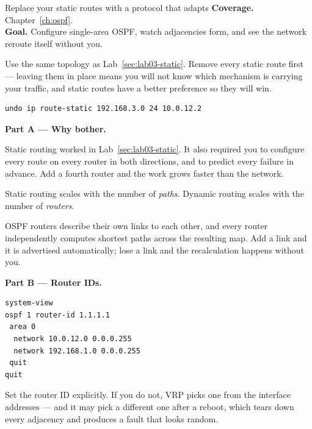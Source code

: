 
\begin{labproject}{Replace your static routes with a protocol that adapts}
\textbf{Coverage.} Chapter~\ref{ch:ospf}.\\
\textbf{Goal.} Configure single-area OSPF, watch adjacencies form, and see the network reroute itself without you.

\begin{labmode}
Use the same topology as Lab~\ref{sec:lab03-static}. Remove every static route first --- leaving them in place means you will not know which mechanism is carrying your traffic, and static routes have a better preference so they will win.

\begin{lstlisting}[style=dcnterminal]
undo ip route-static 192.168.3.0 24 10.0.12.2
\end{lstlisting}
\end{labmode}

\medskip\noindent\textbf{Part A --- Why bother.}\par
Static routing worked in Lab~\ref{sec:lab03-static}. It also required you to configure every route on every router in both directions, and to predict every failure in advance. Add a fourth router and the work grows faster than the network.

\begin{keyidea}
Static routing scales with the number of \emph{paths}. Dynamic routing scales with the number of \emph{routers}.

OSPF routers describe their own links to each other, and every router independently computes shortest paths across the resulting map. Add a link and it is advertised automatically; lose a link and the recalculation happens without you.
\end{keyidea}

\medskip\noindent\textbf{Part B --- Router IDs.}\par

\begin{lstlisting}[style=dcnterminal]
system-view
ospf 1 router-id 1.1.1.1
 area 0
  network 10.0.12.0 0.0.0.255
  network 192.168.1.0 0.0.0.255
 quit
quit
\end{lstlisting}

\begin{pitfall}
Set the router ID explicitly. If you do not, VRP picks one from the interface addresses --- and it may pick a different one after a reboot, which tears down every adjacency and produces a fault that looks random.


\end{pitfall}
\end{labproject}
